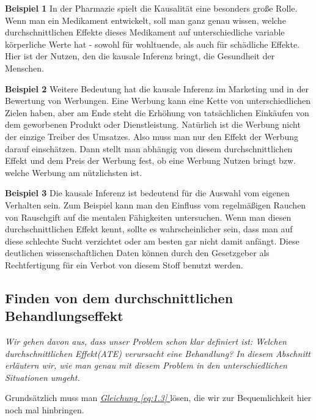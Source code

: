 \documentclass[12pt,a4paper,twoside]{scrartcl}
\numberwithin{equation}{section}
\renewcommand*{\refeq}[1]{\emph{\hyperref[#1]{Gleichung \ref*{#1} }}}
\begin{document}
\noindent
\textbf{Beispiel 1}\label{motivationBeispiel1} In der Pharmazie spielt die Kausalität eine besonders große Rolle. Wenn man ein Medikament entwickelt, soll man ganz genau wissen, welche durchschnittlichen Effekte dieses Medikament auf unterschiedliche variable körperliche Werte hat - sowohl für wohltuende, als auch für schädliche Effekte. Hier ist der Nutzen, den die kausale Inferenz bringt, die Gesundheit der Menschen.\par

\noindent
\textbf{Beispiel 2}\label{motivationBeispiel2} Weitere Bedeutung hat die kausale Inferenz im Marketing und in der Bewertung von Werbungen. Eine Werbung kann eine Kette von unterschiedlichen Zielen haben, aber am Ende steht die Erhöhung von tatsächlichen Einkäufen von dem geworbenen Produkt oder Dienstleistung. Natürlich ist die Werbung nicht der einzige Treiber des Umsatzes. Also muss man nur den Effekt der Werbung darauf einschätzen. Dann stellt man abhängig von diesem durchschnittlichen Effekt und dem Preis der Werbung fest, ob eine Werbung Nutzen bringt bzw. welche Werbung am nützlichsten ist.\par

\noindent
\textbf{Beispiel 3}\label{motivationBeispiel3} Die kausale Inferenz ist bedeutend für die Auswahl vom eigenen Verhalten sein. Zum Beispiel kann man den Einfluss vom regelmäßigen Rauchen von Rauschgift auf die mentalen Fähigkeiten untersuchen. Wenn man diesen durchschnittlichen Effekt kennt, sollte es wahrscheinlicher sein, dass man auf diese schlechte Sucht verzichtet oder am besten gar nicht damit anfängt. Diese deutlichen wissenschaftlichen Daten können durch den Gesetzgeber als Rechtfertigung für ein Verbot von diesem Stoff benutzt werden.\par
\subsection{Finden von dem durchschnittlichen Behandlungseffekt}\label{subsec:findenATE}
\noindent
\textit{Wir gehen davon aus, dass unser Problem schon klar definiert ist: Welchen durchschnittlichen Effekt(ATE) verursacht eine Behandlung? In diesem Abschnitt erläutern wir, wie man genau mit diesem Problem in den unterschiedlichen Situationen umgeht.}\par

\vspace{7mm}

Grundsätzlich muss man \refeq{eq:1.3} lösen, die wir zur Bequemlichkeit hier noch mal hinbringen.\par 
\end{document}
